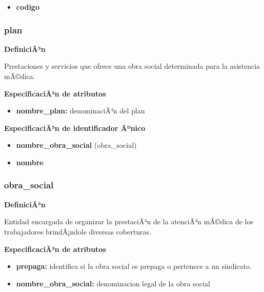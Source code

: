 \documentclass[a4paper,11pt]{article}
\begin{document}
\begin{itemize}

     \item \textbf{codigo}

\end{itemize}

\subsubsection{\textbf{plan}}

\textbf{DefiniciÃ³n}

Prestaciones y servicios que ofrece una obra social determinada para la asistencia mÃ©dica.

\textbf{EspecificaciÃ³n de atributos}

\begin{itemize}

     \item \textbf{nombre\_plan:} denominaciÃ³n del plan

\end{itemize}

\textbf{EspecificaciÃ³n de identificador Ãºnico}

\begin{itemize}

     \item \textbf{nombre\_obra\_social} (obra\_social)

     \item \textbf{nombre}

\end{itemize}

\subsubsection{\textbf{obra\_social}}

\textbf{DefiniciÃ³n}

Entidad encargada de organizar la prestaciÃ³n de la atenciÃ³n mÃ©dica de los 
trabajadores brindÃ¡ndole diversas coberturas.

\textbf{EspecificaciÃ³n de atributos}

\begin{itemize}

     \item \textbf{prepaga:} identifica si la obra social es prepaga o pertenece a un sindicato.

     \item \textbf{nombre\_obra\_social:} denominacion legal de la obra social

\end{itemize}
\end{document}
